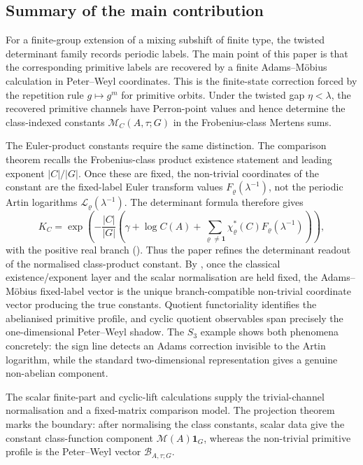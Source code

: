 \documentclass[11pt,a4paper]{amsart}
\theoremstyle{plain}
\theoremstyle{definition}
\theoremstyle{remark}
\begin{document}
\subsection{Summary of the main contribution}

For a finite-group extension of a mixing subshift of finite type, the
twisted determinant family records periodic labels. The main point of
this paper is that the corresponding primitive labels are recovered by a
finite Adams--M\"obius calculation in Peter--Weyl coordinates. This is
the finite-state correction forced by the repetition rule
\(g\mapsto g^m\) for primitive orbits. Under the twisted gap
\(\eta<\lambda\), the recovered primitive channels have Perron-point
values and hence determine the class-indexed constants
\(\mathcal M_C(A,\tau;G)\) in the Frobenius-class Mertens sums.

The Euler-product constants require the same distinction. The comparison
theorem recalls the Frobenius-class product existence statement and leading
exponent \(|C|/|G|\).  Once these are fixed, the non-trivial coordinates of the constant are the fixed-label Euler transform values
\(F_\varrho(\lambda^{-1})\), not the periodic Artin logarithms
\(\mathcal L_\varrho(\lambda^{-1})\). The determinant formula therefore
gives
\[
  K_C=
  \exp\!\left(
    -\frac{|C|}{|G|}
    \left(
      \gamma+\log C(A)
      +\sum_{\varrho\neq\mathbf1}
        \chi_\varrho^\ast(C)F_\varrho(\lambda^{-1})
    \right)
  \right),
\]
with the positive real branch
(). Thus the paper refines the determinant readout of the normalised class-product constant.  By
, once the classical
existence/exponent layer and the scalar normalisation are held fixed, the
Adams--M\"obius fixed-label vector is the unique branch-compatible
non-trivial coordinate vector producing the true constants. Quotient
functoriality identifies the
abelianised primitive profile, and cyclic quotient observables span
precisely the one-dimensional Peter--Weyl shadow. The \(S_3\) example
shows both phenomena concretely: the sign line detects an Adams
correction invisible to the Artin logarithm, while the standard
two-dimensional representation gives a genuine non-abelian component.

The scalar finite-part and cyclic-lift calculations supply the
trivial-channel normalisation and a fixed-matrix comparison model. The
projection theorem
 marks the boundary:
after normalising the class constants, scalar data give the constant
class-function component \(\mathcal M(A)\mathbf 1_G\), whereas the
non-trivial primitive profile is the Peter--Weyl vector
\(\mathcal B_{A,\tau;G}\).
\end{document}
